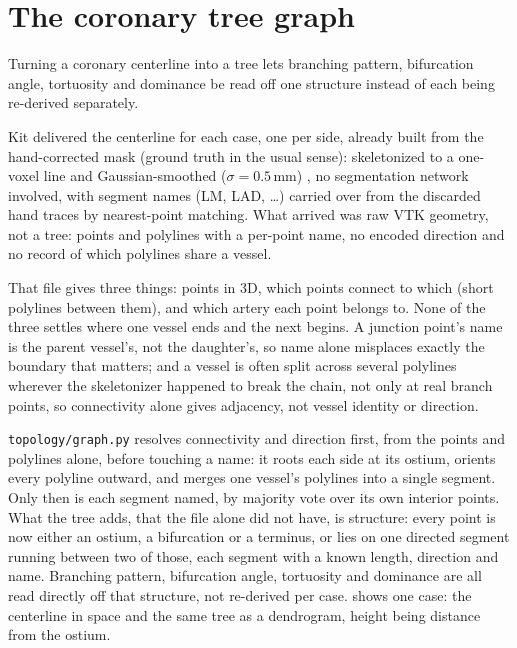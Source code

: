 
\section*{The coronary tree graph}

Turning a coronary centerline into a tree lets branching pattern, bifurcation angle, tortuosity and
dominance be read off one structure instead of each being re-derived separately.

Kit delivered the centerline for each case, one per side, already built from the hand-corrected
mask (ground truth in the usual sense): skeletonized to a one-voxel line and Gaussian-smoothed
($\sigma = 0.5$\,mm) \cite{bransby2026imagecasx}, no segmentation network involved, with segment
names (LM, LAD, \ldots) carried over from the discarded hand traces by nearest-point matching. What
arrived was raw VTK geometry, not a tree: points and polylines with a per-point name, no encoded
direction and no record of which polylines share a vessel.

That file gives three things: points in 3D, which points connect to which (short polylines between
them), and which artery each point belongs to. None of the three settles where one vessel ends and
the next begins. A junction point's name is the parent vessel's, not the daughter's, so name alone
misplaces exactly the boundary that matters; and a vessel is often split across several polylines
wherever the skeletonizer happened to break the chain, not only at real branch points, so
connectivity alone gives adjacency, not vessel identity or direction.

\texttt{topology/graph.py} resolves connectivity and direction first, from the points and polylines
alone, before touching a name: it roots each side at its ostium, orients every polyline outward, and
merges one vessel's polylines into a single segment. Only then is each segment named, by majority
vote over its own interior points. What the tree adds, that the file alone did not have, is
structure: every point is now either an ostium, a bifurcation or a terminus, or lies on one directed
segment running between two of those, each segment with a known length, direction and name.
Branching pattern, bifurcation angle, tortuosity and dominance are all read directly off that
structure, not re-derived per case.  shows one case: the centerline in
space and the same tree as a dendrogram, height being distance from the ostium.

